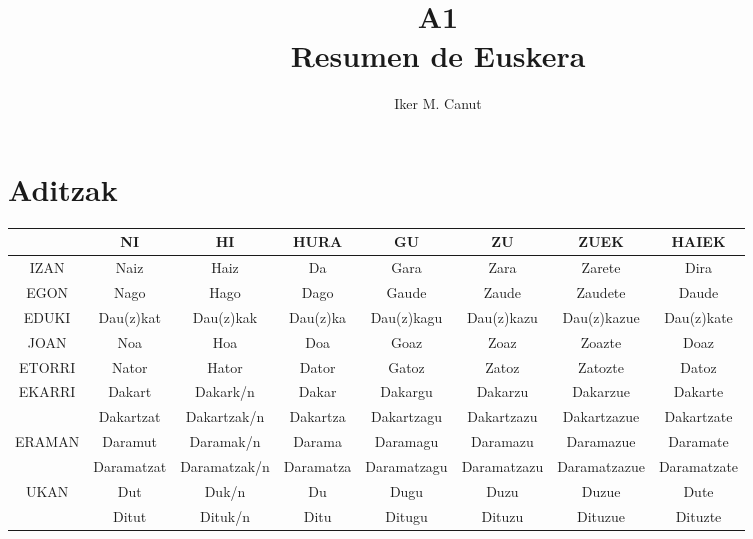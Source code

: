 \documentclass[12pt, a4paper, landscape]{article}
\begin{document}
\author{Iker M. Canut}
\title{A1\\
\large{Resumen de Euskera\\}
}
\maketitle
\newpage

\tableofcontents
\newpage

\section{Aditzak}
\begin{table}[h]
\begin{center}
\begin{tabular}{|c|c|c|c|c|c|c|c|}
\hline
& NI & HI & HURA & GU & ZU & ZUEK & HAIEK \\
\hline
IZAN & Naiz & Haiz & Da & Gara & Zara & Zarete & Dira \\
\hline
EGON & Nago & Hago & Dago & Gaude & Zaude & Zaudete & Daude \\
\hline
EDUKI & Dau(z)kat & Dau(z)kak & Dau(z)ka & Dau(z)kagu & Dau(z)kazu & Dau(z)kazue & Dau(z)kate \\
\hline
JOAN & Noa & Hoa & Doa & Goaz & Zoaz & Zoazte & Doaz \\
\hline
ETORRI & Nator & Hator & Dator & Gatoz & Zatoz & Zatozte & Datoz \\
\hline
\multirow{2}{*}{EKARRI} & Dakart & Dakark/n & Dakar & Dakargu & Dakarzu & Dakarzue & Dakarte \\ & Dakartzat & Dakartzak/n & Dakartza & Dakartzagu & Dakartzazu & Dakartzazue & Dakartzate \\
\hline
\multirow{2}{*}{ERAMAN} & Daramut & Daramak/n & Darama & Daramagu & Daramazu & Daramazue & Daramate \\ & Daramatzat & Daramatzak/n & Daramatza & Daramatzagu & Daramatzazu & Daramatzazue & Daramatzate \\
\hline
\multirow{2}{*}{UKAN} & Dut & Duk/n & Du & Dugu & Duzu & Duzue & Dute \\ & Ditut & Dituk/n & Ditu & Ditugu & Dituzu & Dituzue & Dituzte \\
\hline
\end{tabular}
\end{center}
\end{table}
\newpage
\end{document}
